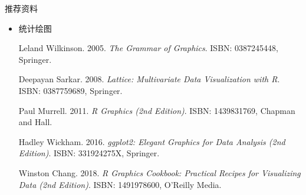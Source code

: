 \begin{frame}[t]{推荐资料}{}
\begin{itemize}
\item 统计绘图
\begin{thebibliography}{10} \footnotesize

{\beamertemplatebookbibitems
Leland Wilkinson. 2005. \emph{The Grammar of Graphics}. ISBN: 0387245448, Springer.}

{\beamertemplatebookbibitems
Deepayan Sarkar. 2008. \emph{Lattice: Multivariate Data Visualization with R}. ISBN: 0387759689, Springer.}

{\beamertemplatebookbibitems
Paul Murrell. 2011. \emph{R Graphics (2nd Edition)}. ISBN: 1439831769, Chapman and Hall.}

{\beamertemplatebookbibitems
Hadley Wickham. 2016. \emph{ggplot2: Elegant Graphics for Data Analysis (2nd Edition)}. ISBN: 331924275X, Springer.}

{\beamertemplatebookbibitems
Winston Chang. 2018. \emph{R Graphics Cookbook: Practical Recipes for Visualizing Data (2nd Edition)}. ISBN: 1491978600, O'Reilly Media.}

\end{thebibliography}
\end{itemize}
\end{frame}